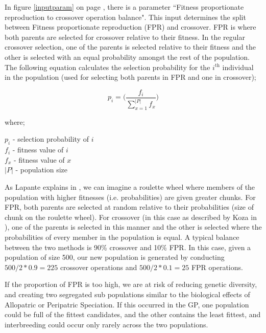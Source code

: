 \documentclass[a4paper,10.5pt]{article}
\begin{document}
In figure \ref{inputparam} on page \pageref{inputparam}, there is a parameter ``Fitness proportionate reproduction to crossover operation balance". This input determines the split between Fitness proportionate reproduction (FPR) and crossover.  FPR is where both parents are selected for crossover relative to their fitness. In the regular crossover selection, one of the parents is selected relative to their fitness and the other is selected with an equal probability amongst the rest of the population. The following equation calculates the selection probability for the $i^{\text{th}}$ individual in the population (used for selecting both parents in FPR and one in crossover);\\
\begin{center}
\noindent\begin{minipage}{.3\linewidth}
\begin{equation*}
p_i = \Bigg( \frac{f_i}{\sum_{x=1}^{|P|} f_x} \Bigg)
\end{equation*}
\end{minipage}%
\begin{minipage}{.2\linewidth}
where;
\end{minipage}
\begin{minipage}{.3\linewidth}
$p_i$ - selection probability of $i$\\
$f_i$ - fitness value of $i$\\
$f_x$ - fitness value of $x$\\
$|P|$  - population size
\end{minipage}
\end{center}

As Lapante explains in \cite[p.63]{lapantebio}, we can imagine a roulette wheel where members of the population with higher fitnesses (i.e. probabilities) are given greater chunks. For FPR, both parents are selected at random relative to their probabilities (size of chunk on the roulette wheel). For crossover (in this case as described by Koza in \cite[p.41]{kozarng}), one of the parents is selected in this manner and the other is selected where the probabilities of every member in the population is equal. A typical balance between the two methods is 90\% crossover and 10\% FPR. In this case, given a population of size 500, our new population is generated by conducting $500/2 * 0.9 = 225$ crossover operations and $500/2 * 0.1 = 25$ FPR operations. 

If the proportion of FPR is too high, we are at risk of reducing genetic diversity, and creating two segregated sub populations similar to the biological effects of Allopatric or Peripatric Speciation.
If this occurred in the GP, one population could be full of the fittest candidates, and the other contains the least fittest, and interbreeding could occur only rarely across the two populations.
\end{document}
